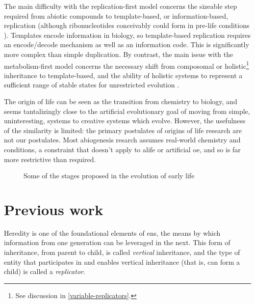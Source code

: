 The main difficulty with the replication-first model concerns the sizeable step required from abiotic compounds to template-based, or information-based, replication (although ribonucleotides conceivably could form in pre-life conditions \parencite{Powner2009}). Templates encode information in biology, so template-based replication requires an encode/decode mechanism as well as an information code. This is significantly more complex than simple duplication. By contrast, the main issue with the metabolism-first model concerns the necessary shift from composomal or holistic\footnote{See discussion in \cref{variable-replicators}.} inheritance to template-based, and the ability of holistic systems to represent a sufficient range of stable states for unrestricted evolution \parencite{Vasas2010}.

The origin of life can be seen as the transition from chemistry to biology, and seems tantalizingly close to the artificial evolutionary goal of moving from simple, uninteresting, systems to creative systems which evolve. However, the usefulness of the similarity is limited: the primary postulates of origins of life research are not our postulates. Most abiogenesis resarch assumes real-world chemistry and conditions, a constraint that doesn't apply to \gls{alife} or artificial \gls{oe}, and so is far more restrictive than required. 

\begin{figure}
	\begin{center}
	\end{center}
	\caption{Some of the stages proposed in the evolution of early life}
	\label{major-stages-early-life}
\end{figure}

\section{Previous work}\label{previous-work}

Heredity is one of the foundational elements of \gls{ens}, the means by which information from one generation can be leveraged in the next. This form of inheritance, from parent to child, is called \emph{vertical} inheritance, and the type of entity that participates in and enables vertical inheritance (that is, can form a child) is called a \emph{replicator}. 

